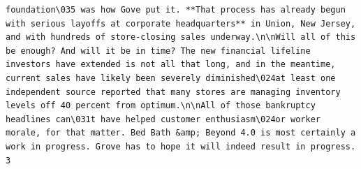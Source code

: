 \documentclass[
  letterpaper,
  DIV=11,
  numbers=noendperiod]{scrreprt}
\begin{document}
\begin{verbatim}
foundation\035 was how Gove put it. **That process has already begun with serious layoffs at corporate headquarters** in Union, New Jersey, and with hundreds of store-closing sales underway.\n\nWill all of this be enough? And will it be in time? The new financial lifeline investors have extended is not all that long, and in the meantime, current sales have likely been severely diminished\024at least one independent source reported that many stores are managing inventory levels off 40 percent from optimum.\n\nAll of those bankruptcy headlines can\031t have helped customer enthusiasm\024or worker morale, for that matter. Bed Bath &amp; Beyond 4.0 is most certainly a work in progress. Grove has to hope it will indeed result in progress.
3                                                                                                                                                                                                                                                                                                                                                                                                                                                                                                                                                                                                                                                                                                                                                                                                                                                                                                                                                                                                                                                                                                                                                                                                                                                                                                                                                                                                                                                                                                                                                                                                                                                                                                                                                                                                                                                                                                                                                                                                                                                                                                                                                                                                                                                                                                                                                                                                                                                                                                                                                                                                                                                                              
\end{verbatim}
\end{document}
